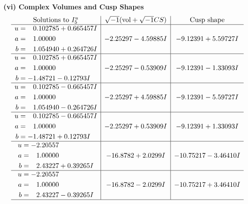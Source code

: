 \documentclass[1p]{elsarticle_modified}
\theoremstyle{definition}
\newcommand{\I}{\sqrt{-1}}
\begin{document}
\newpage\flushleft \textbf{(vi) Complex Volumes and Cusp Shapes}
$$\begin{array}{c|c|c}  
\text{Solutions to }I^u_{5}& \I (\text{vol} + \sqrt{-1}CS) & \text{Cusp shape}\\
 \hline 
\begin{aligned}
u &= \phantom{-}0.102785 + 0.665457 I \\
a &= \phantom{-}1.00000\phantom{ +0.000000I} \\
b &= \phantom{-}1.054940 + 0.264726 I\end{aligned}
 & -2.25297 - 4.59885 I & -9.12391 + 5.59727 I \\ \hline\begin{aligned}
u &= \phantom{-}0.102785 + 0.665457 I \\
a &= \phantom{-}1.00000\phantom{ +0.000000I} \\
b &= -1.48721 - 0.12793 I\end{aligned}
 & -2.25297 - 0.53909 I & -9.12391 - 1.33093 I \\ \hline\begin{aligned}
u &= \phantom{-}0.102785 - 0.665457 I \\
a &= \phantom{-}1.00000\phantom{ +0.000000I} \\
b &= \phantom{-}1.054940 - 0.264726 I\end{aligned}
 & -2.25297 + 4.59885 I & -9.12391 - 5.59727 I \\ \hline\begin{aligned}
u &= \phantom{-}0.102785 - 0.665457 I \\
a &= \phantom{-}1.00000\phantom{ +0.000000I} \\
b &= -1.48721 + 0.12793 I\end{aligned}
 & -2.25297 + 0.53909 I & -9.12391 + 1.33093 I \\ \hline\begin{aligned}
u &= -2.20557\phantom{ +0.000000I} \\
a &= \phantom{-}1.00000\phantom{ +0.000000I} \\
b &= \phantom{-}2.43227 + 0.39265 I\end{aligned}
 & -16.8782 + 2.0299 I & -10.75217 - 3.46410 I \\ \hline\begin{aligned}
u &= -2.20557\phantom{ +0.000000I} \\
a &= \phantom{-}1.00000\phantom{ +0.000000I} \\
b &= \phantom{-}2.43227 - 0.39265 I\end{aligned}
 & -16.8782 - 2.0299 I & -10.75217 + 3.46410 I\\
 \hline 
 \end{array}$$\newpage\newpage\renewcommand{\arraystretch}{1}
\end{document}
